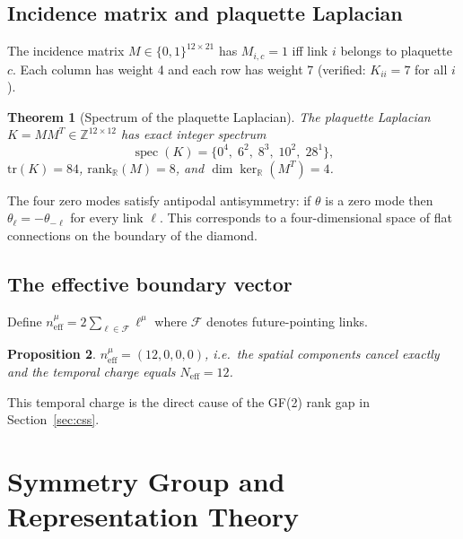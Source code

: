 \documentclass[12pt,a4paper]{article}
\theoremstyle{plain}
\newtheorem{theorem}{Theorem}[section]
\newtheorem{proposition}[theorem]{Proposition}
\theoremstyle{definition}
\newcommand{\R}{\mathbb{R}}
\newcommand{\Z}{\mathbb{Z}}
\newcommand{\Neff}{N_{\mathrm{eff}}}
\newcommand{\tr}{\mathrm{tr}}
\newcommand{\rank}{\mathrm{rank}}
\DeclareMathOperator{\spec}{spec}
\begin{document}
\subsection{Incidence matrix and plaquette Laplacian}

The incidence matrix $M \in \{0,1\}^{12 \times 21}$ has $M_{i,c} = 1$
iff link $i$ belongs to plaquette $c$.  Each column has weight 4 and
each row has weight 7 (verified: $K_{ii} = 7$ for all $i$).

\begin{theorem}[Spectrum of the plaquette Laplacian]
\label{thm:spectrum}
  The plaquette Laplacian $K = MM^T \in \Z^{12 \times 12}$ has
  exact integer spectrum~\cite{Schmitt2026a}
  \begin{equation}
    \spec(K) = \{0^4,\; 6^2,\; 8^3,\; 10^2,\; 28^1\},
    \label{eq:spectrum}
  \end{equation}
  $\tr(K) = 84$, $\rank_\R(M) = 8$, and
  $\dim\ker_\R(M^T) = 4$.
\end{theorem}

The four zero modes satisfy antipodal antisymmetry: if $\theta$ is a
zero mode then $\theta_{\ell} = -\theta_{-\ell}$ for every link $\ell$.
This corresponds to a four-dimensional space of flat connections on the
boundary of the diamond.

\subsection{The effective boundary vector}

Define $n_{\mathrm{eff}}^\mu = 2\sum_{\ell \in \mathcal{F}} \ell^\mu$
where $\mathcal{F}$ denotes future-pointing links.

\begin{proposition}
  $n_{\mathrm{eff}}^\mu = (12, 0, 0, 0)$, i.e.\ the spatial
  components cancel exactly and the temporal charge equals $\Neff = 12$.
\end{proposition}

This temporal charge is the direct cause of the GF(2) rank gap in
Section~\ref{sec:css}.

\section{Symmetry Group and Representation Theory}
\label{sec:symmetry}
\end{document}
